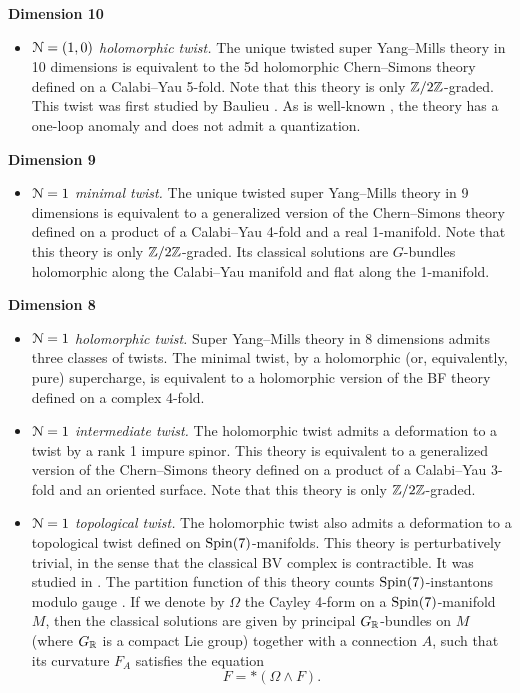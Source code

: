 \documentclass[10pt, oneside]{article}
\begin{document}
\textbf{Dimension 10}
\begin{itemize}
 \item \emph{$\mathcal{N}=(1,0)$ holomorphic twist.} The unique twisted super Yang--Mills theory in 10 dimensions is equivalent to the 5d holomorphic Chern--Simons theory defined on a Calabi--Yau 5-fold. Note that this theory is only $\mathbb Z/2\mathbb Z$-graded. This twist was first studied by Baulieu \cite{Baulieu}. As is well-known \cite{GSanomaly}, the theory has a one-loop anomaly and does not admit a quantization.
\end{itemize}

\textbf{Dimension 9}
\begin{itemize}
 \item \emph{$\mathcal{N}=1$ minimal twist.} The unique twisted super Yang--Mills theory in 9 dimensions is equivalent to a generalized version of the Chern--Simons theory defined on a product of a Calabi--Yau 4-fold and a real 1-manifold. Note that this theory is only $\mathbb Z/2\mathbb Z$-graded. Its classical solutions are $G$-bundles holomorphic along the Calabi--Yau manifold and flat along the 1-manifold.
\end{itemize}

\textbf{Dimension 8}
\begin{itemize}
 \item \emph{$\mathcal{N}=1$ holomorphic twist.} Super Yang--Mills theory in 8 dimensions admits three classes of twists.  The minimal twist, by a holomorphic (or, equivalently, pure) supercharge, is equivalent to a holomorphic version of the BF theory defined on a complex 4-fold.
 \item \emph{$\mathcal{N}=1$ intermediate twist.} The holomorphic twist admits a deformation to a twist by a rank 1 impure spinor. This theory is equivalent to a generalized version of the Chern--Simons theory defined on a product of a Calabi--Yau 3-fold and an oriented surface. Note that this theory is only $\mathbb Z/2\mathbb Z$-graded.
 \item \emph{$\mathcal{N}=1$ topological twist.} The holomorphic twist also admits a deformation to a topological twist defined on $\mathrm{Spin}(7)$-manifolds. This theory is perturbatively trivial, in the sense that the classical BV complex is contractible. It was studied in \cite{AcharyaOLoughlinSpence,BaulieuKannoSinger}. The partition function of this theory counts $\mathrm{Spin}(7)$-instantons modulo gauge \cite{Lewis,DonaldsonThomas,ReyesCarrion}. If we denote by $\Omega$ the Cayley 4-form on a $\mathrm{Spin}(7)$-manifold $M$, then the classical solutions are given by principal $G_\mathbb R$-bundles on $M$ (where $G_\mathbb R$ is a compact Lie group) together with a connection $A$, such that its curvature $F_A$ satisfies the equation
\begin{equation} 
 F = \ast (\Omega\wedge F).
 \end{equation}
\end{itemize}
\end{document}
